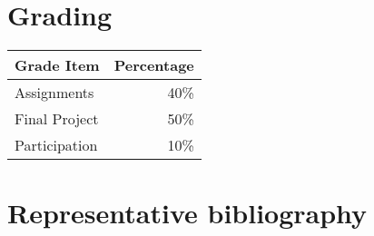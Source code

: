 \section{Grading}

\begin{tabular}{lr}
Grade Item	  & Percentage\\
\toprule
Assignments	  & 40\% \\
Final Project	& 50\% \\
Participation	& 10\% \\
\bottomrule
\end{tabular}




\section{Representative bibliography}

